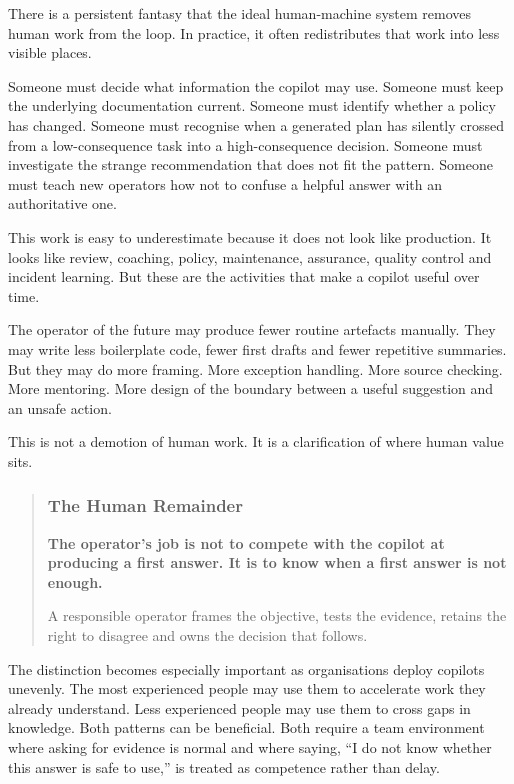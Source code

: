 There is a persistent fantasy that the ideal human-machine system
removes human work from the loop. In practice, it often redistributes
that work into less visible places.

Someone must decide what information the copilot may use. Someone must
keep the underlying documentation current. Someone must identify whether
a policy has changed. Someone must recognise when a generated plan has
silently crossed from a low-consequence task into a high-consequence
decision. Someone must investigate the strange recommendation that does
not fit the pattern. Someone must teach new operators how not to confuse
a helpful answer with an authoritative one.

This work is easy to underestimate because it does not look like
production. It looks like review, coaching, policy, maintenance,
assurance, quality control and incident learning. But these are the
activities that make a copilot useful over time.

The operator of the future may produce fewer routine artefacts manually.
They may write less boilerplate code, fewer first drafts and fewer
repetitive summaries. But they may do more framing. More exception
handling. More source checking. More mentoring. More design of the
boundary between a useful suggestion and an unsafe action.

This is not a demotion of human work. It is a clarification of where
human value sits.

\begin{quote}
\subsubsection{The Human Remainder}\label{the-human-remainder}

\textbf{The operator's job is not to compete with the copilot at
producing a first answer. It is to know when a first answer is not
enough.}

A responsible operator frames the objective, tests the evidence, retains
the right to disagree and owns the decision that follows.
\end{quote}

The distinction becomes especially important as organisations deploy
copilots unevenly. The most experienced people may use them to
accelerate work they already understand. Less experienced people may use
them to cross gaps in knowledge. Both patterns can be beneficial. Both
require a team environment where asking for evidence is normal and where
saying, ``I do not know whether this answer is safe to use,'' is treated
as competence rather than delay.

